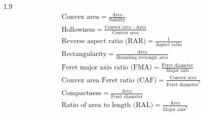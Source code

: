 \documentclass[phd]{ndsu-thesis-2022}
\newcommand\myspacing{1.9}      %
\begin{document}
\begin{spacing}{\myspacing}
\setlength{\abovedisplayskip}{-12pt} %
\begin{align}
&\text{Convex area} = \frac{\text{Area}}{\text{Solidity}} \label{eq1} \\[1ex]
&\text{Hollowness} = \frac{\text{Convex area - Area}}{\text{Convex area}} \label{eq2} \\[1ex]
&\text{Reverse aspect ratio (RAR)} = \frac{\text{1}}{\text{Aspect ratio}} \label{eq3} \\[1ex]
&\text{Rectangularity} = \frac{\text{Area}}{\text{Bounding rectangle area}} \label{eq4} \\[1ex]
&\text{Feret major axis ratio (FMA)} = \frac{\text{Feret diameter}}{\text{Major axis}} \label{eq5} \\[1ex]
&\text{Convex area Feret ratio (CAF)} = \frac{\text{Convex area}}{\text{Feret diameter}^2} \label{eq6}\\[1ex]
&\text{Compactness} = \frac{\text{Area}}{\text{Feret diameter}} \label{eq7}\\[1ex]
&\text{Ratio of area to length (RAL)} = \frac{\text{Area}}{\text{Major axis}^2} \label{eq8}
\end{align}


\end{spacing}
\end{document}
